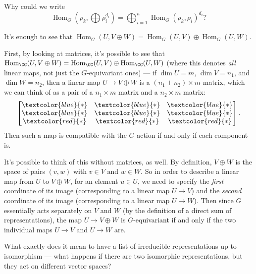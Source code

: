 \begin{question}
Why could we write \[\operatorname{Hom}_G\left(\rho_k, \bigoplus \rho_i^{ d_i}\right) = \bigoplus_{i = 1}^n \operatorname{Hom}_G(\rho_k, \rho_i)^{ d_i}?\]
\end{question}

\begin{ans}
It's enough to see that $\operatorname{Hom}_G(U, V \oplus W) = \operatorname{Hom}_G(U, V) \oplus \operatorname{Hom}_G(U, W)$. 

First, by looking at matrices, it's possible to see that $\operatorname{Hom}_{\CC}(U, V \oplus W) = \operatorname{Hom}_{\CC}(U, V) \oplus \operatorname{Hom}_{\CC}(U, W)$ (where this denotes \emph{all} linear maps, not just the $G$-equivariant ones) --- if $\dim U = m$, $\dim V = n_1$, and $\dim W = n_2$, then a linear map $U \to V \oplus W$ is a $(n_1 + n_2) \times m$ matrix, which we can think of as a pair of a $n_1 \times m$ matrix and a $n_2 \times m$ matrix: \[\begin{bmatrix} \textcolor{blue}{*} &  \textcolor{blue}{*} & \textcolor{blue}{*} \\ \textcolor{blue}{*} & \textcolor{blue}{*} & \textcolor{blue}{*} \\ \textcolor{red}{*} & \textcolor{red}{*} & \textcolor{red}{*}\end{bmatrix}.\] Then such a map is compatible with the $G$-action if and only if each component is.

It's possible to think of this without matrices, as well. By definition, $V \oplus W$ is the space of pairs $(v, w)$ with $v \in V$ and $w \in W$. So in order to describe a linear map from $U$ to $V \oplus W$, for an element $u \in U$, we need to specify the \emph{first} coordinate of its image (corresponding to a linear map $U \to V$) and the \emph{second} coordinate of its image (corresponding to a linear map $U \to W$). Then since $G$ essentially acts separately on $V$ and $W$ (by the definition of a direct sum of representations), the map $U \to V \oplus W$ is $G$-equivariant if and only if the two individual maps $U \to V$ and $U \to W$ are. 
\end{ans}

\begin{question}
What exactly does it mean to have a list of irreducible representations up to isomorphism --- what happens if there are two isomorphic representations, but they act on different vector spaces?
\end{question}

